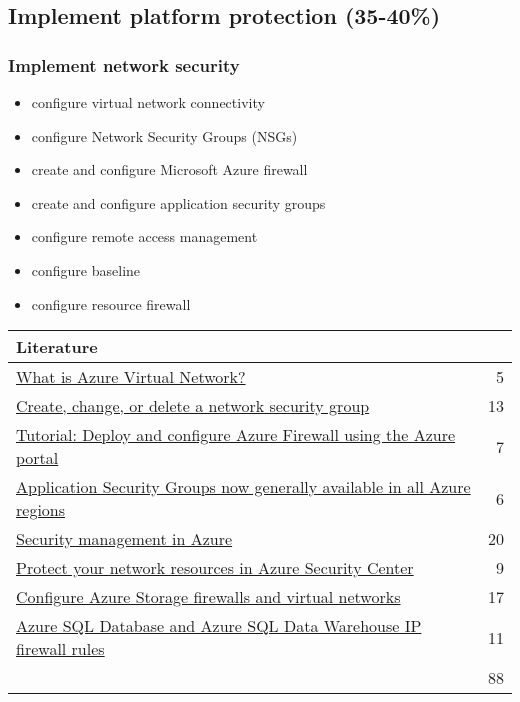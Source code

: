 \clearpage
\subsection{Implement platform protection (35-40\%)}

\subsubsection{Implement network security}
\begin{itemize}
\item configure virtual network connectivity 
\item configure Network Security Groups (NSGs) 
\item create and configure Microsoft Azure firewall 
\item create and configure application security groups 
\item configure remote access management 
\item configure baseline 
\item configure resource firewall 
\end{itemize}

\begin{tabular}{p{14cm} | r}
\textbf{Literature} & \\
\hline
\href{https://docs.microsoft.com/en-us/azure/virtual-network/virtual-networks-overview}{What is Azure Virtual Network?} & 5 \\
\href{https://docs.microsoft.com/en-us/azure/virtual-network/manage-network-security-group}{Create, change, or delete a network security group} & 13 \\
\href{https://docs.microsoft.com/en-us/azure/firewall/tutorial-firewall-deploy-portal}{Tutorial: Deploy and configure Azure Firewall using the Azure portal} & 7 \\
\href{https://azure.microsoft.com/en-gb/blog/applicationsecuritygroups/}{Application Security Groups now generally available in all Azure regions} & 6 \\
\href{https://docs.microsoft.com/en-us/azure/security/fundamentals/management}{Security management in Azure} & 20 \\
\href{https://docs.microsoft.com/en-us/azure/security-center/security-center-network-recommendations}{Protect your network resources in Azure Security Center} & 9 \\
\href{https://docs.microsoft.com/en-us/azure/storage/common/storage-network-security}{Configure Azure Storage firewalls and virtual networks} & 17 \\
\href{https://docs.microsoft.com/en-us/azure/sql-database/sql-database-firewall-configure}{Azure SQL Database and Azure SQL Data Warehouse IP firewall rules} & 11 \\
\cline{2-2} 
 & 88 \\
\end{tabular}


